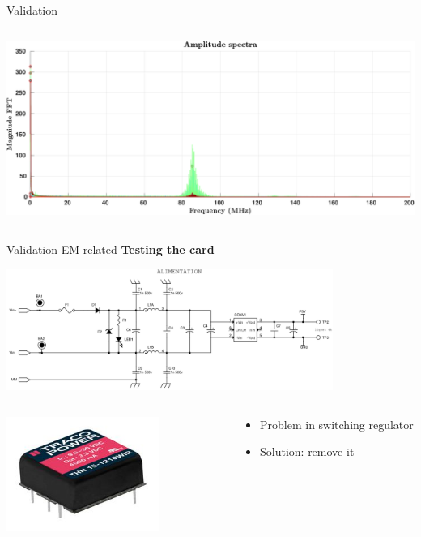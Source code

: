 \documentclass[utf8]{beamer} \usetheme{lfcr} %
\begin{document}
\begin{frame}{Validation}
\begin{columns}
\begin{column}{0.5\textwidth}
      \includegraphics[width=\textwidth]{Before_HFnoise_ampspec2.pdf}
    \end{column}
  \end{columns}

\end{frame}
%
\begin{frame}{Validation}
  {EM-related}
  \vspace*{-.5cm}
  \textbf{Testing the card}

  \vspace*{2.5cm}
  \hspace*{3cm}
  \includegraphics[width=0.8\textwidth]{alimentationcircuit.png}


  \begin{columns}
    \begin{column}{0.5\textwidth}
      \includegraphics[width=0.7\textwidth]{converter.jpg}
    \end{column}
    \begin{column}{0.5\textwidth}
      \begin{itemize}
        \item Problem in switching regulator
        \item Solution: remove it
      \end{itemize}
    \end{column}
  \end{columns}

\end{frame}
\end{document}
